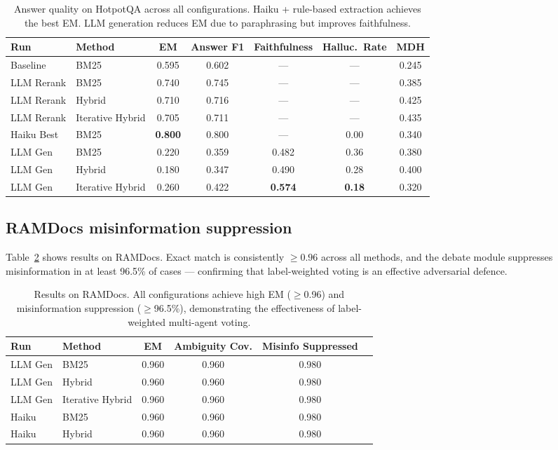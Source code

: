 \documentclass{article}
\begin{document}
\begin{table}[h]
  \caption{Answer quality on HotpotQA across all configurations.
  Haiku + rule-based extraction achieves the best EM.  LLM generation
  reduces EM due to paraphrasing but improves faithfulness.}
  \label{tab:answer}
  \centering
  \small
  \begin{tabular}{llccccc}
    \toprule
    Run & Method & EM & Answer F1 & Faithfulness & Halluc.\ Rate & MDH \\
    \midrule
    Baseline    & BM25            & 0.595 & 0.602 & — & — & 0.245 \\
    LLM Rerank  & BM25            & 0.740 & 0.745 & — & — & 0.385 \\
    LLM Rerank  & Hybrid          & 0.710 & 0.716 & — & — & 0.425 \\
    LLM Rerank  & Iterative Hybrid& 0.705 & 0.711 & — & — & 0.435 \\
    Haiku Best  & BM25            & \textbf{0.800} & 0.800 & — & 0.00 & 0.340 \\
    LLM Gen     & BM25            & 0.220 & 0.359 & 0.482 & 0.36 & 0.380 \\
    LLM Gen     & Hybrid          & 0.180 & 0.347 & 0.490 & 0.28 & 0.400 \\
    LLM Gen     & Iterative Hybrid& 0.260 & 0.422 & \textbf{0.574} & \textbf{0.18} & 0.320 \\
    \bottomrule
  \end{tabular}
\end{table}

\subsection{RAMDocs misinformation suppression}

Table~\ref{tab:ramdocs} shows results on RAMDocs.  Exact match is
consistently $\geq 0.96$ across all methods, and the debate module
suppresses misinformation in at least 96.5\% of cases — confirming
that label-weighted voting is an effective adversarial defence.

\begin{table}[h]
  \caption{Results on RAMDocs. All configurations achieve high EM ($\geq$0.96)
  and misinformation suppression ($\geq$96.5\%), demonstrating the
  effectiveness of label-weighted multi-agent voting.}
  \label{tab:ramdocs}
  \centering
  \small
  \begin{tabular}{llcccc}
    \toprule
    Run & Method & EM & Ambiguity Cov. & Misinfo Suppressed \\
    \midrule
    LLM Gen & BM25             & 0.960 & 0.960 & 0.980 \\
    LLM Gen & Hybrid           & 0.960 & 0.960 & 0.980 \\
    LLM Gen & Iterative Hybrid & 0.960 & 0.960 & 0.980 \\
    Haiku   & BM25             & 0.960 & 0.960 & 0.980 \\
    Haiku   & Hybrid           & 0.960 & 0.960 & 0.980 \\
    \bottomrule
  \end{tabular}
\end{table}
\end{document}
